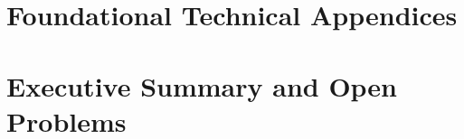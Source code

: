 \documentclass[11pt,a4paper]{report}
\begin{document}
\chapter{Foundational Technical Appendices}
\label{ch:diamond-standard}






\chapter{Executive Summary and Open Problems}
\label{ch:executive-summary}








\end{document}
